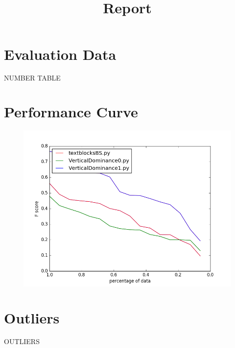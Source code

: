 \documentclass[a4paper,10pt]{article}
\begin{document}
\title{Report}
\maketitle
\section*{Evaluation Data}
NUMBER
TABLE
\section*{Performance Curve}
\begin{figure}[!htbp]
\centering
\includegraphics[width = 15cm]{performance.png} 
\end{figure}
\section*{Outliers}
OUTLIERS
\end{document}

